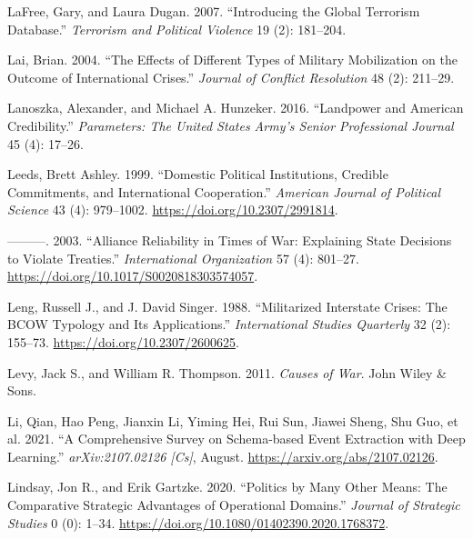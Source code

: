 \documentclass{article}
\newlength{\cslhangindent}
\newlength{\cslentryspacingunit} %
\newenvironment{CSLReferences}[2] %
 {%
  \setlength{\parindent}{0pt}
  \ifodd #1
  \let\oldpar\par
  \def\par{\hangindent=\cslhangindent\oldpar}
  \fi
  \setlength{\parskip}{#2\cslentryspacingunit}
 }%
 {}
\begin{document}
\begin{CSLReferences}{1}{0}
\leavevmode{}%
LaFree, Gary, and Laura Dugan. 2007. {``Introducing the Global Terrorism
Database.''} \emph{Terrorism and Political Violence} 19 (2): 181--204.

\leavevmode{}%
Lai, Brian. 2004. {``The Effects of Different Types of Military
Mobilization on the Outcome of International Crises.''} \emph{Journal of
Conflict Resolution} 48 (2): 211--29.

\leavevmode{}%
Lanoszka, Alexander, and Michael A. Hunzeker. 2016. {``Landpower and
{American} Credibility.''} \emph{Parameters: The United States Army's
Senior Professional Journal} 45 (4): 17--26.

\leavevmode{}%
Leeds, Brett Ashley. 1999. {``Domestic {Political Institutions},
{Credible Commitments}, and {International Cooperation}.''}
\emph{American Journal of Political Science} 43 (4): 979--1002.
\url{https://doi.org/10.2307/2991814}.

\leavevmode{}%
---------. 2003. {``Alliance {Reliability} in {Times} of {War}:
{Explaining State Decisions} to {Violate Treaties}.''}
\emph{International Organization} 57 (4): 801--27.
\url{https://doi.org/10.1017/S0020818303574057}.

\leavevmode{}%
Leng, Russell J., and J. David Singer. 1988. {``Militarized {Interstate
Crises}: {The BCOW Typology} and {Its Applications}.''}
\emph{International Studies Quarterly} 32 (2): 155--73.
\url{https://doi.org/10.2307/2600625}.

\leavevmode{}%
Levy, Jack S., and William R. Thompson. 2011. \emph{Causes of War}.
{John Wiley \& Sons}.

\leavevmode{}%
Li, Qian, Hao Peng, Jianxin Li, Yiming Hei, Rui Sun, Jiawei Sheng, Shu
Guo, et al. 2021. {``A {Comprehensive Survey} on {Schema-based Event
Extraction} with {Deep Learning}.''} \emph{arXiv:2107.02126 {[}Cs{]}},
August. \url{https://arxiv.org/abs/2107.02126}.

\leavevmode{}%
Lindsay, Jon R., and Erik Gartzke. 2020. {``Politics by Many Other
Means: {The} Comparative Strategic Advantages of Operational Domains.''}
\emph{Journal of Strategic Studies} 0 (0): 1--34.
\url{https://doi.org/10.1080/01402390.2020.1768372}.


\end{CSLReferences}
\end{document}
